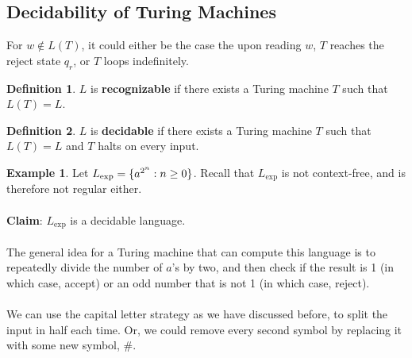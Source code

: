 \documentclass[]{article}
\DeclarePairedDelimiter{\set}{\lbrace}{\rbrace}
\theoremstyle{definition}
\newtheorem*{defn}{Definition}
\newtheorem{ex}{Example}[section]
\newcommand{\lecture}[1]{\marginpar{{\footnotesize $\leftarrow$ \underline{#1}}}}
\begin{document}
    \subsection{Decidability of Turing Machines} \lecture{November 14, 2013}
      For $w \not \in L(T)$, it could either be the case the upon reading $w$, $T$ reaches the reject state $q_r$, or $T$ loops indefinitely.

      \begin{defn}
        $L$ is \textbf{recognizable} if there exists a Turing machine $T$ such that $L(T) = L$.
      \end{defn}

      \begin{defn}
        $L$ is \textbf{decidable} if there exists a Turing machine $T$ such that $L(T) = L$ and $T$ halts on every input.
      \end{defn}

      \begin{ex}
        Let $L_\text{exp} = \set{a^{2^n} : n \ge 0}$. Recall that $L_\text{exp}$ is not context-free, and is therefore not regular either.
        \\ \\
        \textbf{Claim}: $L_\text{exp}$ is a decidable language.
        \\ \\
        The general idea for a Turing machine that can compute this language is to repeatedly divide the number of $a$'s by two, and then check if the result is 1 (in which case, accept) or an odd number that is not 1 (in which case, reject).
        \\ \\
        We can use the capital letter strategy as we have discussed before, to split the input in half each time. Or, we could remove every second symbol by replacing it with some new symbol, \#.
      \end{ex}
\end{document}
